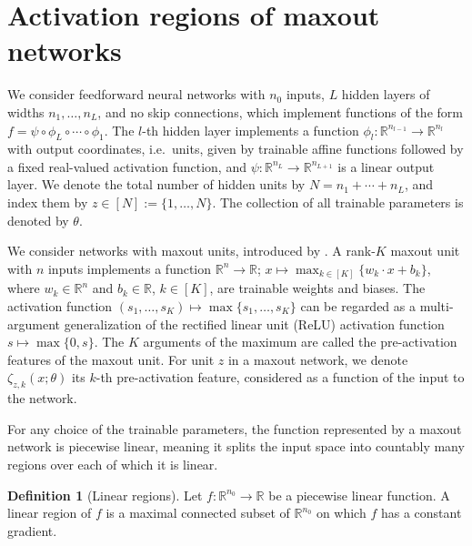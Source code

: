 \documentclass{article}
\theoremstyle{definition}
\newtheorem{definition}[theorem]{Definition}
\newcommand{\nin}{n_0}
\begin{document}
\section{Activation regions of maxout networks} 
\label{section:definitions}

We consider feedforward neural networks with $n_0$ inputs, $L$ hidden layers of widths $n_1,\ldots, n_L$, and no skip connections, which implement functions of the form $f = \psi \circ \phi_{L} \circ \cdots \circ \phi_1$. 
The $l$-th hidden layer implements a function $\phi_l\colon \mathbb{R}^{n_{l-1}}\to\mathbb{R}^{n_l}$ with output coordinates, i.e.\ units, given by trainable affine functions followed by a fixed real-valued activation function, and $\psi\colon\mathbb{R}^{n_L}\to\mathbb{R}^{n_{L+1}}$ is a linear output layer. 
We denote the total number of hidden units by $N=n_1+\cdots+ n_L$, and index them by $z\in [N]:=\{1,\ldots, N\}$. The collection of all trainable parameters is denoted by $\theta$. 

We consider networks with maxout units, introduced by \citet{goodfellow2013maxout}.
A rank-$K$ maxout unit with $n$ inputs implements a function $\mathbb{R}^n\to\mathbb{R}$; $x\mapsto \max_{k \in [K]} \{ w_{k} \cdot x + b_{k}\}$, where $w_{k} \in \mathbb{R}^{n}$ and $b_{k} \in \mathbb{R}$, $k\in [K]$, are trainable weights and biases. 
The activation function $(s_1,\ldots, s_K)\mapsto \max\{s_1,\ldots, s_K\}$ can be regarded as a multi-argument generalization of the rectified linear unit (ReLU) activation function $s\mapsto \max\{0,s\}$. 
The $K$ arguments of the maximum are called the pre-activation features of the maxout unit. 
For unit $z$ in a maxout network, we denote $\zeta_{z,k}(x;\theta)$ its $k$-th pre-activation feature, considered as a function of the input to the network. 

For any choice of the trainable parameters, the function represented by a maxout network is piecewise linear, meaning it splits the input space into countably many regions over each of which it is linear. 

\begin{definition}[Linear regions]
    Let $f\colon \mathbb{R}^{\nin}\to\mathbb{R}$ be a piecewise linear function. 
    A linear region of $f$ is a maximal connected subset of $\mathbb{R}^{\nin}$ on which $f$ has a constant gradient. 
\end{definition}
\end{document}
